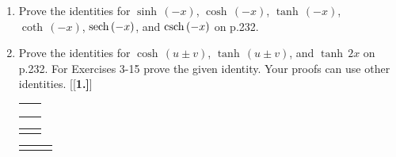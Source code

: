 \divider
\vspace{2mm}
\startexercises\label{sec7dot5}
{\small
{}
\begin{enumerate}[\bfseries 1.]
 \item Prove the identities for $\sinh\,(-x)$, $\cosh\,(-x)$, $\tanh\,(-x)$,
  $\coth\,(-x)$, $\operatorname{sech}\,(-x)$, and $\operatorname{csch}\,(-x)$ on p.232.
 \item Prove the identities for $\cosh\,(u \pm v)$, $\tanh\,(u \pm v)$, and
  $\tanh\,2x$ on p.232.
\noindent For Exercises 3-15 prove the given identity. Your proofs can use
 other identities.
[{[\bfseries 1.]}]
\vspace{-5mm}

\begin{tabular}{@{}p{7.75cm}p{7.25cm}@{}}
 \item $\sinh\,A\;\cosh\,B ~=~ \frac{1}{2}\left(\sinh\,(A+B) \;+\; \sinh\,(A-B)\right)$ &
 \item $\tanh^2 x + \sech^2 x ~=~ 1$\\[-4pt]
 \item $\sinh\,A\;\sinh\,B ~=~ \frac{1}{2}\left(\cosh\,(A+B) \;-\;
  \cosh\,(A-B)\right)$ &
 \item $\coth^2 x - \csch^2 x ~=~ 1$\\[-4pt]
 \item $\cosh\,A\;\cosh\,B ~=~ \frac{1}{2}\left(\cosh\,(A+B) \;+\; \cosh\,(A-B)\right)$ &
 \item\label{exer:coth1overx} $\coth^{-1}\left(\frac{1}{x}\right) ~=~ \tanh^{-1} x$
\end{tabular}\vspace{-3mm}

\begin{tabular}[h]{@{}p{9.5cm}p{5.5cm}@{}}
 \item $\cosh\,2x ~=~ \cosh^2 x + \sinh^2 x ~=~ 2\,\cosh^2 x - 1 ~=~
  1 + 2\,\sinh^2 x\vphantom{\dfrac{\cosh\,x-1}{2}}$ &
 \item $\sinh^2 \frac{x}{2} ~=~ \dfrac{\cosh\,x \;-\; 1}{2}$
\end{tabular}\vspace{-3mm}

\begin{tabular}{@{}p{4.25cm}p{4.25cm}p{6.5cm}@{}}
 \item $\cosh^2 \frac{x}{2} ~=~ \dfrac{\cosh\,x \;+\; 1}{2}$ &
 \item $\tanh^2 \frac{x}{2} ~=~ \dfrac{\cosh\,x \;-\; 1}{\cosh\,x \;+\; 1}$ &
 \item $\tanh\,\frac{x}{2} ~=~ \dfrac{\cosh\,x \;-\; 1}{\sinh\,x} ~=~
  \dfrac{\sinh\,x}{\cosh\,x \;+\; 1}$
\end{tabular}


\end{enumerate}}
